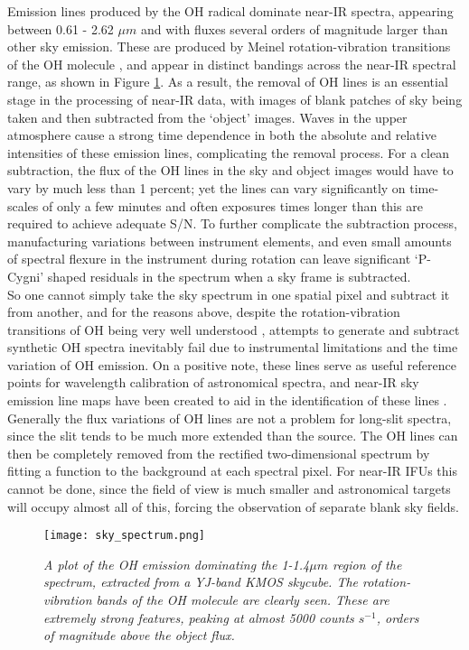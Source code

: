 \documentclass{literature}
\begin{document}
Emission lines produced by the OH radical dominate near-IR spectra, appearing between 0.61 - 2.62 $\mu m$ and with fluxes several orders of magnitude larger than other sky emission. These are produced by Meinel rotation-vibration transitions of the OH molecule \citep{Meinel1950}, and appear in distinct bandings across the near-IR spectral range, as shown in Figure \ref{fig:sky_spec}. As a result, the removal of OH lines is an essential stage in the processing of near-IR data, with images of blank patches of sky being taken and then subtracted from the `object' images. Waves in the upper atmosphere cause a strong time dependence in both the absolute and relative intensities of these emission lines, complicating the removal process. For a clean subtraction, the flux of the OH lines in the sky and object images would have to vary by much less than 1 percent; yet the lines can vary significantly on time-scales of only a few minutes and often exposures times longer than this are required to achieve adequate S/N. To further complicate the subtraction process, manufacturing variations between instrument elements, and even small amounts of spectral flexure in the instrument during rotation can leave significant `P-Cygni' shaped residuals in the spectrum when a sky frame is subtracted. \\ 
So one cannot simply take the sky spectrum in one spatial pixel and subtract it from another, and for the reasons above, despite the rotation-vibration transitions of OH being very well understood \citep{Osterbrock1996}, attempts to generate and subtract synthetic OH spectra inevitably fail due to instrumental limitations and the time variation of OH emission. On a positive note, these lines serve as useful reference points for wavelength calibration of astronomical spectra, and near-IR sky emission line maps have been created to aid in the identification of these lines \citep{Rousselot2000}. Generally the flux variations of OH lines are not a problem for long-slit spectra, since the slit tends to be much more extended than the source. The OH lines can then be completely removed from the rectified two-dimensional spectrum by fitting a function to the background at each spectral pixel. For near-IR IFUs this cannot be done, since the field of view is much smaller and astronomical targets will occupy almost all of this, forcing the observation of separate blank sky fields.\\ 


\begin{figure}[!htp]
\centering
\texttt{[image: sky\_spectrum.png]}
\caption{\footnotesize{\emph{A plot of the OH emission dominating the 1-1.4$\mu m$ region of the spectrum, extracted from a YJ-band KMOS skycube. The rotation-vibration bands of the OH molecule are clearly seen. These are extremely strong features, peaking at almost 5000 counts $s^{-1}$, orders of magnitude above the object flux.}}}
\label{fig:sky_spec}
\end{figure}
\end{document}
